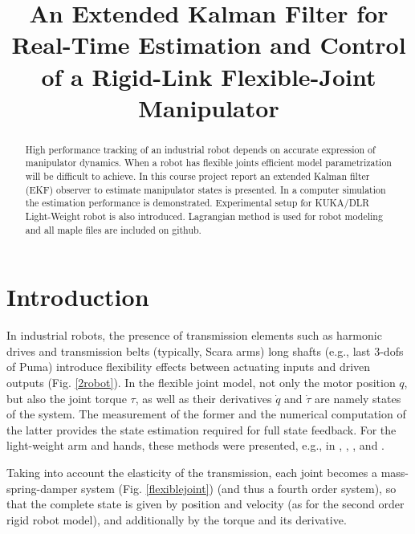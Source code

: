 \documentclass[conference]{IEEEtran}
\begin{document}
\title{An Extended Kalman Filter for Real-Time Estimation and Control of a
Rigid-Link Flexible-Joint Manipulator}
\author{
} 
\maketitle


\begin{abstract}
High performance tracking of an industrial robot depends on accurate expression
of manipulator dynamics. When a robot has flexible joints efficient model
parametrization will be difficult to achieve. In this course project report an
extended Kalman filter (EKF) observer to estimate manipulator states is
presented. In a computer simulation the estimation performance is demonstrated.
Experimental setup for KUKA/DLR Light-Weight robot is also introduced. Lagrangian
method is used for robot modeling and all maple files are included on github.
\end{abstract}
\IEEEpeerreviewmaketitle



\section{Introduction}
In industrial robots, the presence of transmission elements such as harmonic
drives and transmission belts (typically, Scara arms) long shafts (e.g., last
3-dofs of Puma) introduce flexibility effects between actuating inputs and
driven outputs (Fig. \ref{2robot}). In the flexible joint model, not only the
motor position $q$, but also the joint torque $\tau$, as well as their derivatives $\dot{q}$ and
$\dot{\tau}$  are namely states of the system. The measurement of the former and
the numerical computation of the latter provides the state estimation required
for full state feedback. For the light-weight arm and hands, these methods were
presented, e.g., in \cite{1}, \cite{2}, \cite{3}, and \cite{4}.

Taking into account the elasticity of the transmission, each joint becomes a
mass-spring-damper system (Fig. \ref{flexiblejoint}) (and thus a fourth order
system), so that the complete state is given by position and velocity (as for the second
order rigid robot model), and additionally by the torque and its derivative.
\end{document}
